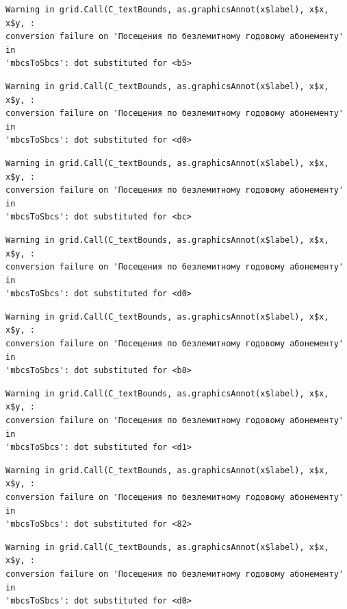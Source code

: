\documentclass[
  letterpaper,
  DIV=11,
  numbers=noendperiod]{scrartcl}
\begin{document}
\begin{verbatim}
Warning in grid.Call(C_textBounds, as.graphicsAnnot(x$label), x$x, x$y, :
conversion failure on 'Посещения по безлемитному годовому абонементу' in
'mbcsToSbcs': dot substituted for <b5>
\end{verbatim}

\begin{verbatim}
Warning in grid.Call(C_textBounds, as.graphicsAnnot(x$label), x$x, x$y, :
conversion failure on 'Посещения по безлемитному годовому абонементу' in
'mbcsToSbcs': dot substituted for <d0>
\end{verbatim}

\begin{verbatim}
Warning in grid.Call(C_textBounds, as.graphicsAnnot(x$label), x$x, x$y, :
conversion failure on 'Посещения по безлемитному годовому абонементу' in
'mbcsToSbcs': dot substituted for <bc>
\end{verbatim}

\begin{verbatim}
Warning in grid.Call(C_textBounds, as.graphicsAnnot(x$label), x$x, x$y, :
conversion failure on 'Посещения по безлемитному годовому абонементу' in
'mbcsToSbcs': dot substituted for <d0>
\end{verbatim}

\begin{verbatim}
Warning in grid.Call(C_textBounds, as.graphicsAnnot(x$label), x$x, x$y, :
conversion failure on 'Посещения по безлемитному годовому абонементу' in
'mbcsToSbcs': dot substituted for <b8>
\end{verbatim}

\begin{verbatim}
Warning in grid.Call(C_textBounds, as.graphicsAnnot(x$label), x$x, x$y, :
conversion failure on 'Посещения по безлемитному годовому абонементу' in
'mbcsToSbcs': dot substituted for <d1>
\end{verbatim}

\begin{verbatim}
Warning in grid.Call(C_textBounds, as.graphicsAnnot(x$label), x$x, x$y, :
conversion failure on 'Посещения по безлемитному годовому абонементу' in
'mbcsToSbcs': dot substituted for <82>
\end{verbatim}

\begin{verbatim}
Warning in grid.Call(C_textBounds, as.graphicsAnnot(x$label), x$x, x$y, :
conversion failure on 'Посещения по безлемитному годовому абонементу' in
'mbcsToSbcs': dot substituted for <d0>
\end{verbatim}
\end{document}

